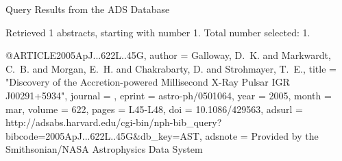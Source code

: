 Query Results from the ADS Database


Retrieved 1 abstracts, starting with number 1.  Total number selected: 1.

@ARTICLE{2005ApJ...622L..45G,
   author = {{Galloway}, D.~K. and {Markwardt}, C.~B. and {Morgan}, E.~H. and 
	{Chakrabarty}, D. and {Strohmayer}, T.~E.},
    title = "{Discovery of the Accretion-powered Millisecond X-Ray Pulsar IGR J00291+5934}",
  journal = {\apjl},
   eprint = {astro-ph/0501064},
     year = 2005,
    month = mar,
   volume = 622,
    pages = {L45-L48},
      doi = {10.1086/429563},
   adsurl = {http://adsabs.harvard.edu/cgi-bin/nph-bib_query?bibcode=2005ApJ...622L..45G&db_key=AST},
  adsnote = {Provided by the Smithsonian/NASA Astrophysics Data System}
}


